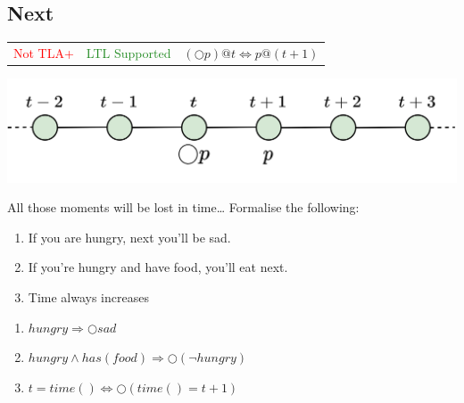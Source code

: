 \subsection{Next}
\begin{tabular}{c | c r}
    \textcolor{red}{Not TLA+} & \textcolor{ForestGreen}{LTL Supported} & $(\bigcirc p)@t \Leftrightarrow p@(t+1)$ \\
\end{tabular}
\begin{center}
    \includegraphics[width=.7\textwidth]{linear_time_logic/images/next_operator.drawio.png}
\end{center}
\begin{examplebox}{All those moments will be lost in time\dots}
    Formalise the following:
    \begin{enumerate}
        \item If you are hungry, next you'll be sad.
        \item If you're hungry and have food, you'll eat next.
        \item Time always increases
    \end{enumerate}
    \tcblower
    \begin{enumerate}
        \item $hungry \Rightarrow \bigcirc sad$
        \item $hungry \land has(food) \Rightarrow \bigcirc (\neg hungry)$
        \item $t = time() \Leftrightarrow \bigcirc (time() = t + 1)$
    \end{enumerate}
\end{examplebox}

